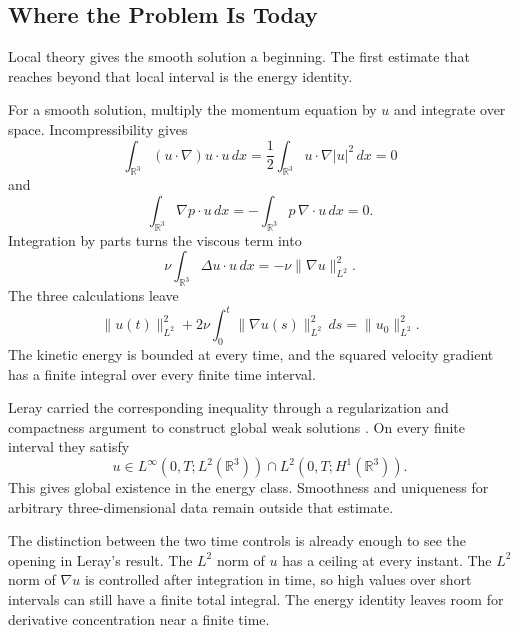 \subsection{Where the Problem Is Today}\label{sub:HistoricalEstimates}

Local theory gives the smooth solution a beginning.
The first estimate that reaches beyond that local interval is the energy identity.

\newpage
{}

For a smooth solution, multiply the momentum equation by \(u\) and integrate over space.
Incompressibility gives
\[
  \int_{\mathbb R^3} (u\cdot\nabla)u\cdot u\,dx
  =
  \frac12\int_{\mathbb R^3} u\cdot\nabla |u|^2\,dx
  =
  0
\]
and
\[
  \int_{\mathbb R^3} \nabla p\cdot u\,dx
  =
  -\int_{\mathbb R^3} p\,\nabla\cdot u\,dx
  =
  0.
\]
Integration by parts turns the viscous term into
\[
  \nu\int_{\mathbb R^3} \Delta u\cdot u\,dx
  =
  -\nu\lVert\nabla u\rVert_{L^2}^{2}.
\]
The three calculations leave
\[
  \lVert u(t)\rVert_{L^2}^{2}
  +
  2\nu\int_0^t\lVert\nabla u(s)\rVert_{L^2}^{2}\,ds
  =
  \lVert u_0\rVert_{L^2}^{2}.
\]
The kinetic energy is bounded at every time, and the squared velocity gradient has a finite integral over every finite time interval.

Leray carried the corresponding inequality through a regularization and compactness argument to construct global weak solutions \parencite{Leray1934}.
On every finite interval they satisfy
\[
  u\in
  L^\infty(0,T;L^2(\mathbb R^3))
  \cap
  L^2(0,T;H^1(\mathbb R^3)).
\]
This gives global existence in the energy class.
Smoothness and uniqueness for arbitrary three-dimensional data remain outside that estimate.

The distinction between the two time controls is already enough to see the opening in Leray's result.
The \(L^2\) norm of \(u\) has a ceiling at every instant.
The \(L^2\) norm of \(\nabla u\) is controlled after integration in time, so high values over short intervals can still have a finite total integral.
The energy identity leaves room for derivative concentration near a finite time.

